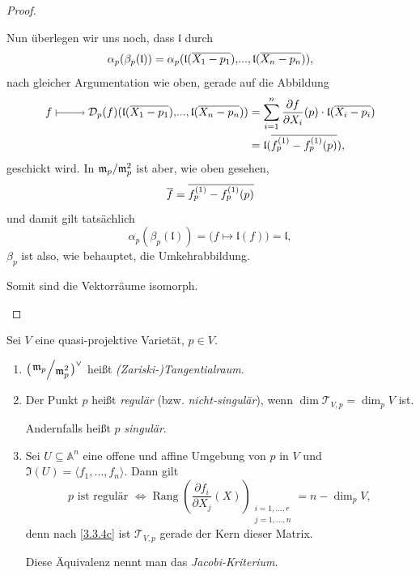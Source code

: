 \documentclass[a4paper,12pt,index=toc]{scrbook}
\theoremstyle{keinenummern} %
\def\A{\mathbb{A}}
\def\I{\mathfrak{I}}
\newcommand{\DD}{\mathcal{D}} %
\def\l{\mathfrak{l}}
\def\T{\mathcal{T}}
\def\m{\mathfrak{m}}
\newcommand{\Rang}{\operatorname{Rang}}
\let\olddotsc\dotsc %
\renewcommand{\dotsc}{\ensuremath{\!...}}
\def\Bar#1{\ensuremath\overline{#1}}
\begin{document}
\begin{proof}
\begin{enumerate}
Nun überlegen wir uns noch, dass $\l$ durch
\begin{equation*}\alpha_{p}(\beta_{p}(\l))=\alpha_{p}(\l(\Bar{X_{1}-p_{1}}),\dotsc,\l(\Bar{X_{n}-p_{n}})),\end{equation*}
nach gleicher Argumentation wie oben, gerade auf die Abbildung
\begin{align*}
f\mapsto \DD_{p}(f)(\l(\Bar{X_{1}-p_{1}}),\dotsc,\l(\Bar{X_{n}-p_{n}}))&=\sum_{i=1}^{n}\frac{\partial f}{\partial X_{i}}(p)\cdot \l(\Bar{X_{i}-p_{i}})\\
&=\l(\Bar{f_{p}^{(1)}-f_{p}^{(1)}(p)}),
\end{align*}
geschickt wird. In $\Quotient{\m_{p}}{\m_{p}^{2}}$ ist aber, wie oben gesehen,
\begin{equation*}\Bar{f}=\Bar{f_{p}^{(1)}-f_{p}^{(1)}(p)}\end{equation*}
und damit gilt tatsächlich
\begin{equation*}\alpha_{p}(\beta_{p}(\l))=\bigl(f\mapsto \l(f)\bigr)=\l,\end{equation*}
$\beta_{p}$ ist also, wie behauptet, die Umkehrabbildung.

Somit sind die Vektorräume isomorph.
\end{enumerate}\end{proof}

\begin{db}\label{3.3.10}
Sei $V$ eine quasi-projektive Varietät, $p\in V$.
\begin{enumerate}
\item{} $\displaystyle \bigl(\Quotient{\m_{p}}{\m_{p}^{2}}\bigr)^{\vee}$ heißt \emph{(Zariski-)Tangentialraum}.
\item{} Der Punkt $p$ heißt \emph{regulär} (bzw. \emph{nicht-singulär}), wenn $\dim\T_{V,p}=\dim_{p} V$ ist.

Andernfalls heißt $p$ \emph{singulär}.
\item{} Sei $U\subseteq\A^{n}$ eine offene und affine Umgebung von $p$ in $V$ und $\I(U)=\langle f_{1},\dotsc,f_{n}\rangle$. Dann gilt
\begin{equation*}p\text{ ist regulär }\iff \Rang\left(\frac{\partial f_{i}}{\partial X_{j}}(X)\right)_{\substack{i=1,\olddotsc,r\\ j=1,\olddotsc,n}}=n-\dim_{p}V,\end{equation*}
denn nach \cref{3.3.4c} ist $\T_{V,p}$ gerade der Kern dieser Matrix.

Diese Äquivalenz nennt man das \emph{Jacobi-Kriterium}.
\end{enumerate}\end{db}
\end{document}
